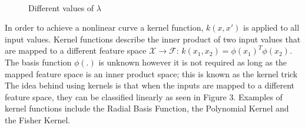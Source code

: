 \documentclass[a4paper,11pt,twoside]{article}
\begin{document}
\begin{figure} [h!]
\\
\caption{Different values of $\lambda$}
\end{figure}


In order to achieve a nonlinear curve a kernel function, $k(x,x')$ is applied to all input values. Kernel functions describe the inner product of two input values that are mapped to a different feature space $\mathcal{X} \rightarrow \mathcal{F}$: $k(x_{1},x_{2}) = \phi(x_{1})^T\phi(x_{2})$. The basis function $\phi(.)$ is unknown however it is not required as long as the mapped feature space is an inner product space; this is known as the kernel trick The idea behind using kernels is that when the inputs are mapped to a different feature space, they can be classified linearly as seen in Figure 3. Examples of kernel functions include the Radial Basis Function, the Polynomial Kernel and the  Fisher Kernel.
\end{document}
